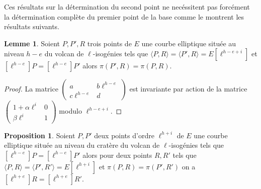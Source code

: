 \documentclass[10pt,a4paper]{book}
\theoremstyle{plain}
\theoremstyle{definition}
\newtheorem{lem}[thm]{Lemme}
\theoremstyle{definition}
\theoremstyle{definition}
\newtheorem{prop}[thm]{Proposition}
\theoremstyle{definition}
\theoremstyle{remark}
\theoremstyle{remark}
\theoremstyle{definition}
\begin{document}
%

Ces résultats sur la détermination du second point ne necéssitent pas forcément
la détermination complète du premier point de la base comme le montrent les 
résultats suivants.

\begin{lem}
\label{lem:fro:atk}
Soient $P,P',R$ trois points de $E$ une courbe elliptique située au 
niveau $h-e$ du volcan de $\ell$-isogénies tels que $\langle P,R \rangle= 
\langle P',R \rangle=E[\ell^{h-e+i}]$ et $[\ell^{h-e}]P=[\ell^{h-e}]P'$ alors 
$\pi(P',R)=\pi(P,R)$.
\end{lem}

\begin{proof}
La matrice $\left( \begin{smallmatrix}a & b\ell^{h-e} \\c\ell^{h-e}  & d \end{smallmatrix} 
\right)$ est invariante par action de la matrice $\left( 
\begin{smallmatrix}1 + \alpha \ell^{i} & 0 \\\beta\ell^{i}  & 1 \end{smallmatrix} 
\right)$ modulo $\ell^{h-e+i}$.
\end{proof}

\begin{prop}
Soient $P,P'$ deux points d'ordre $\ell^{h+i}$ de $E$ une courbe elliptique 
située au niveau du cratère du volcan de $\ell$-isogénies tels que $[\ell^{h-e}]P=
[\ell^{h-e}]P'$ alors pour deux points $R,R'$ tels que $\langle P, R \rangle = 
\langle P', R' \rangle=E[\ell^{h+i}]$ et $\pi(P,R)=\pi(P',R')$ on a 
$[\ell^{h+e}]R=[\ell^{h+e}]R'$.
\end{prop}
\end{document}

